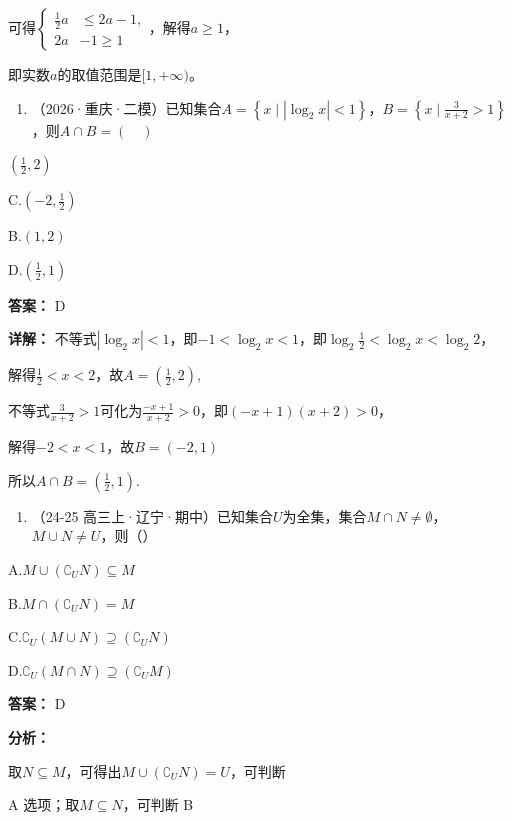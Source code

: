 \documentclass[11pt,a4paper]{ctexart}
\begin{document}
可得\(\left\{\begin{aligned}\frac{1}{2}a&\leq2a-1,\\ 2a&-1\geq1\end{aligned}\right.\)，解得\(a\geq1\)，

即实数\(a\)的取值范围是\([1,+\infty)\)。

\begin{enumerate}[label=\arabic*., leftmargin=*, start=3]
\item （2026·重庆·二模）已知集合\(A = \left\{x \mid \left|\log_2 x\right| < 1\right\}\)，\(B = \left\{x \mid \frac{3}{x + 2} > 1\right\}\)，则\(A \cap B = (\quad)\)
\end{enumerate}

\(\left(\frac{1}{2},2\right)\)

C.\(\left(-2,\frac{1}{2}\right)\)

B.\((1,2)\)

D.\(\left(\frac{1}{2},1\right)\)

\textbf{答案：}
D

\textbf{详解：}
不等式\(|\log_{2}x|<1\)，即\(-1<\log_{2}x<1\)，即\(\log_{2}\frac{1}{2}<\log_{2}x<\log_{2}2\)，

解得\(\frac{1}{2}<x<2\)，故\(A=\left(\frac{1}{2},2\right)\),

不等式\(\frac{3}{x+2}>1\)可化为\(\frac{-x+1}{x+2}>0\)，即\((-x+1)(x+2)>0\)，

解得\(-2 < x < 1\)，故\(B = (-2,1)\)

所以\(A \cap B = \left(\frac{1}{2}, 1\right)\).

\begin{enumerate}[label=\arabic*., leftmargin=*, start=4]
\item （24-25
  高三上·辽宁·期中）已知集合\(U\)为全集，集合\(M \cap N \neq \emptyset\)，\(M \cup N \neq U\)，则（）
\end{enumerate}

A.\(M \cup (\complement_U N) \subseteq M\)

B.\(M \cap (\complement_U N) = M\)

C.\(\complement_U(M \cup N) \supseteq (\complement_UN)\)

D.\(\complement_U(M \cap N) \supseteq (\complement_UM)\)

\textbf{答案：}
D

\textbf{分析：}

取\(N \subseteq M\)，可得出\(M \cup (\complement_U N) = U\)，可判断

A 选项；取\(M \subseteq N\)，可判断 B
\end{document}
